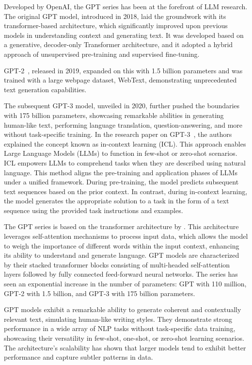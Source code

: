 Developed by OpenAI, the GPT series has been at the forefront of LLM research.
The original GPT model, introduced in 2018, laid the groundwork with its transformer-based architecture, which significantly improved upon previous models in understanding context and generating text.
It was developed based on a generative, decoder-only Transformer architecture, and it adopted a hybrid approach of unsupervised pre-training and supervised fine-tuning.

GPT-2~\cite{radford2019language}, released in 2019, expanded on this with 1.5 billion parameters and was trained with a large webpage dataset, WebText, demonstrating unprecedented text generation capabilities.

The subsequent GPT-3 model, unveiled in 2020, further pushed the boundaries with 175 billion parameters, showcasing remarkable abilities in generating human-like text, performing language translation, question-answering, and more without task-specific training.
In the research paper on GPT-3~\cite{brown2020language}, the authors explained the concept known as in-context learning (ICL). This approach enables Large Language Models (LLMs) to function in few-shot or zero-shot scenarios.
ICL empowers LLMs to comprehend tasks when they are described using natural language.
This method aligns the pre-training and application phases of LLMs under a unified framework. During pre-training, the model predicts subsequent text sequences based on the prior context.
In contrast, during in-context learning, the model generates the appropriate solution to a task in the form of a text sequence using the provided task instructions and examples.

The GPT series is based on the transformer architecture by \textcite{vaswani2023attention}.
This architecture leverages self-attention mechanisms to process input data, which allows the model to weigh the importance of different words within the input context, enhancing its ability to understand and generate language.
GPT models are characterized by their stacked transformer blocks consisting of multi-headed self-attention layers followed by fully connected feed-forward neural networks.
The series has seen an exponential increase in the number of parameters: GPT with 110 million, GPT-2 with 1.5 billion, and GPT-3 with 175 billion parameters.

GPT models exhibit a remarkable ability to generate coherent and contextually relevant text, simulating human-like writing styles.
They demonstrate strong performance in a wide array of NLP tasks without task-specific data training, showcasing their versatility in few-shot, one-shot, or zero-shot learning scenarios.
The architecture's scalability has shown that larger models tend to exhibit better performance and capture subtler patterns in data.

